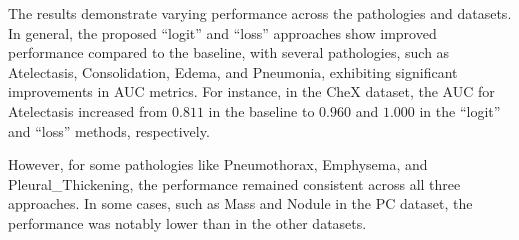 \documentclass[preprint,3p,times, review]{elsarticle}
\begin{document}
The results demonstrate varying performance across the pathologies and datasets. In general, the proposed ``logit'' and ``loss'' approaches show improved performance compared to the baseline, with several pathologies, such as Atelectasis, Consolidation, Edema, and Pneumonia, exhibiting significant improvements in AUC metrics. For instance, in the CheX dataset, the AUC for Atelectasis increased from $0.811$ in the baseline to $0.960$ and $1.000$ in the ``logit'' and ``loss'' methods, respectively.

However, for some pathologies like Pneumothorax, Emphysema, and Pleural\_Thickening, the performance remained consistent across all three approaches. In some cases, such as Mass and Nodule in the PC dataset, the performance was notably lower than in the other datasets.


\begin{table}[]
\caption{AUC performance of the three methods (baseline, ``logit'', and ``loss'') on the CheX, NIH, and PC chest radiograph datasets for various pathologies.}
\end{table}
\end{document}
